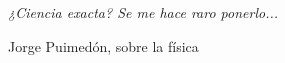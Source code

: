 \documentclass[a4paper,11pt,notitle]{article}
\begin{document}
\begin{flushright}
\emph{
¿Ciencia exacta? Se me hace raro ponerlo...}

\sc Jorge Puimedón, sobre la física
\end{flushright}
\end{document}
